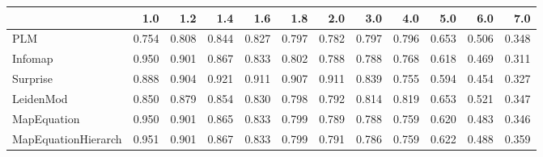 \begin{tabular}{lrrrrrrrrrrr}
\toprule
{} &   1.0 &   1.2 &   1.4 &   1.6 &   1.8 &   2.0 &   3.0 &   4.0 &   5.0 &   6.0 &   7.0 \\
\midrule
PLM                 & 0.754 & 0.808 & 0.844 & 0.827 & 0.797 & 0.782 & 0.797 & 0.796 & 0.653 & 0.506 & 0.348 \\
Infomap             & 0.950 & 0.901 & 0.867 & 0.833 & 0.802 & 0.788 & 0.788 & 0.768 & 0.618 & 0.469 & 0.311 \\
Surprise            & 0.888 & 0.904 & 0.921 & 0.911 & 0.907 & 0.911 & 0.839 & 0.755 & 0.594 & 0.454 & 0.327 \\
LeidenMod           & 0.850 & 0.879 & 0.854 & 0.830 & 0.798 & 0.792 & 0.814 & 0.819 & 0.653 & 0.521 & 0.347 \\
MapEquation         & 0.950 & 0.901 & 0.865 & 0.833 & 0.799 & 0.789 & 0.788 & 0.759 & 0.620 & 0.483 & 0.346 \\
MapEquationHierarch & 0.951 & 0.901 & 0.867 & 0.833 & 0.799 & 0.791 & 0.786 & 0.759 & 0.622 & 0.488 & 0.359 \\
\bottomrule
\end{tabular}
